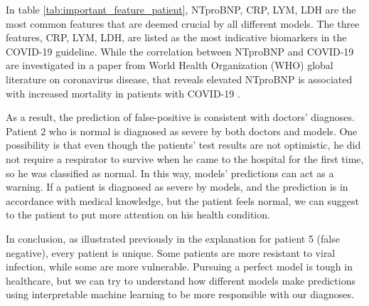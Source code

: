

In table \ref{tab:important_feature_patient}, NTproBNP, CRP, LYM, LDH are the most common features that are deemed crucial by all different models. The three features, CRP, LYM, LDH, are listed as the most indicative biomarkers in the COVID-19 guideline. While the correlation between NTproBNP and COVID-19 are investigated in a paper from World Health Organization (WHO) global literature on coronavirus disease, that reveals elevated NTproBNP is associated with increased mortality in patients with COVID-19 \citep{Pranata387}.

As a result, the prediction of false-positive is consistent with doctors' diagnoses. Patient 2 who is normal is diagnosed as severe by both doctors and models. One possibility is that even though the patients' test results are not optimistic, he did not require a respirator to survive when he came to the hospital for the first time, so he was classified as normal. In this way, models' predictions can act as a warning. If a patient is diagnosed as severe by models, and the prediction is in accordance with medical knowledge, but the patient feels normal, we can suggest to the patient to put more attention on his health condition.

In conclusion, as illustrated previously in the explanation for patient 5 (false negative), every patient is unique. Some patients are more resistant to viral infection, while some are more vulnerable. Pursuing a perfect model is tough in healthcare, but we can try to understand how different models make predictions using interpretable machine learning to be more responsible with our diagnoses.
\color{black}

